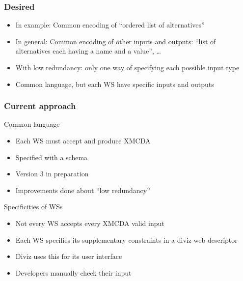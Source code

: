 \documentclass[french,english]{beamer}
\begin{document}
\begin{frame}
	\frametitle{Desired}
	\begin{itemize}
		\item In example: Common encoding of “ordered list of alternatives”
		\item In general: Common encoding of other inputs and outputs: “list of alternatives each having a name and a value”, …
		\item With low redundancy: only one way of specifying each possible input type
		\item Common language, but each WS have specific inputs and outputs
	\end{itemize}
\end{frame}

\begin{frame}
	\frametitle{Current approach}
	Common language
	\begin{itemize}
		\item Each \ac{WS} must accept and produce XMCDA
		\item Specified with a schema
		\item Version 3 in preparation
		\item Improvements done about “low redundancy”
	\end{itemize}
	Specificities of \acp{WS}
	\begin{itemize}
		\item Not every \ac{WS} accepts every XMCDA valid input
		\item Each \ac{WS} specifies its supplementary constraints in a diviz web descriptor
		\item Diviz uses this for its user interface
		\item Developers manually check their input
	\end{itemize}
\end{frame}
\end{document}
